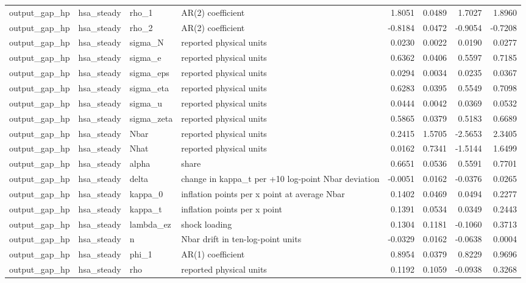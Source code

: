 \begin{tabular}{llllrrrr}
output\_gap\_hp & hsa\_steady & rho\_1 & AR(2) coefficient & 1.8051 & 0.0489 & 1.7027 & 1.8960 \\
output\_gap\_hp & hsa\_steady & rho\_2 & AR(2) coefficient & -0.8184 & 0.0472 & -0.9054 & -0.7208 \\
output\_gap\_hp & hsa\_steady & sigma\_N & reported physical units & 0.0230 & 0.0022 & 0.0190 & 0.0277 \\
output\_gap\_hp & hsa\_steady & sigma\_e & reported physical units & 0.6362 & 0.0406 & 0.5597 & 0.7185 \\
output\_gap\_hp & hsa\_steady & sigma\_eps & reported physical units & 0.0294 & 0.0034 & 0.0235 & 0.0367 \\
output\_gap\_hp & hsa\_steady & sigma\_eta & reported physical units & 0.6283 & 0.0395 & 0.5549 & 0.7098 \\
output\_gap\_hp & hsa\_steady & sigma\_u & reported physical units & 0.0444 & 0.0042 & 0.0369 & 0.0532 \\
output\_gap\_hp & hsa\_steady & sigma\_zeta & reported physical units & 0.5865 & 0.0379 & 0.5183 & 0.6689 \\
output\_gap\_hp & hsa\_steady & Nbar & reported physical units & 0.2415 & 1.5705 & -2.5653 & 2.3405 \\
output\_gap\_hp & hsa\_steady & Nhat & reported physical units & 0.0162 & 0.7341 & -1.5144 & 1.6499 \\
output\_gap\_hp & hsa\_steady & alpha & share & 0.6651 & 0.0536 & 0.5591 & 0.7701 \\
output\_gap\_hp & hsa\_steady & delta & change in kappa\_t per +10 log-point Nbar deviation & -0.0051 & 0.0162 & -0.0376 & 0.0265 \\
output\_gap\_hp & hsa\_steady & kappa\_0 & inflation points per x point at average Nbar & 0.1402 & 0.0469 & 0.0494 & 0.2277 \\
output\_gap\_hp & hsa\_steady & kappa\_t & inflation points per x point & 0.1391 & 0.0534 & 0.0349 & 0.2443 \\
output\_gap\_hp & hsa\_steady & lambda\_ez & shock loading & 0.1304 & 0.1181 & -0.1060 & 0.3713 \\
output\_gap\_hp & hsa\_steady & n & Nbar drift in ten-log-point units & -0.0329 & 0.0162 & -0.0638 & 0.0004 \\
output\_gap\_hp & hsa\_steady & phi\_1 & AR(1) coefficient & 0.8954 & 0.0379 & 0.8229 & 0.9696 \\
output\_gap\_hp & hsa\_steady & rho & reported physical units & 0.1192 & 0.1059 & -0.0938 & 0.3268 \\

\end{tabular}
